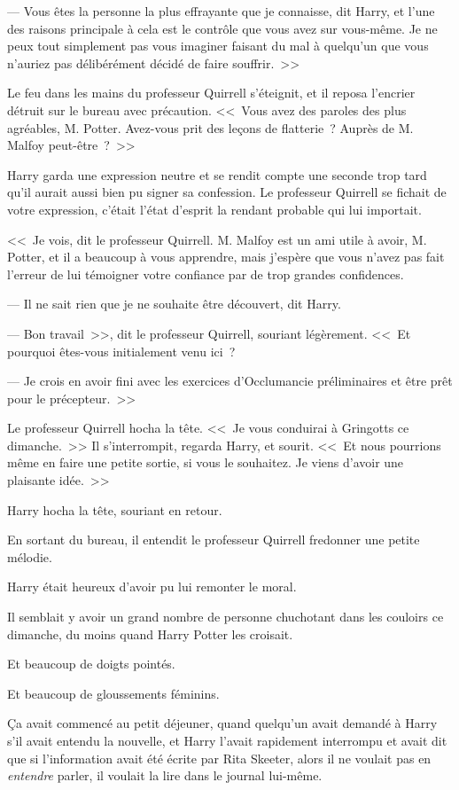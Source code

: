 --- Vous êtes la personne la plus effrayante que je connaisse, dit Harry, et l'une des raisons principale à cela est le contrôle que vous avez sur vous-même. Je ne peux tout simplement pas vous imaginer faisant du mal à quelqu'un que vous n'auriez pas délibérément décidé de faire souffrir.~>>

Le feu dans les mains du professeur Quirrell s'éteignit, et il reposa l'encrier détruit sur le bureau avec précaution. <<~Vous avez des paroles des plus agréables, M. Potter. Avez-vous prit des leçons de flatterie~? Auprès de M. Malfoy peut-être~?~>>

Harry garda une expression neutre et se rendit compte une seconde trop tard qu'il aurait aussi bien pu signer sa confession. Le professeur Quirrell se fichait de votre expression, c'était l'état d'esprit la rendant probable qui lui importait.

<<~Je vois, dit le professeur Quirrell. M. Malfoy est un ami utile à avoir, M. Potter, et il a beaucoup à vous apprendre, mais j'espère que vous n'avez pas fait l'erreur de lui témoigner votre confiance par de trop grandes confidences.

--- Il ne sait rien que je ne souhaite être découvert, dit Harry.

--- Bon travail~>>, dit le professeur Quirrell, souriant légèrement. <<~Et pourquoi êtes-vous initialement venu ici~?

--- Je crois en avoir fini avec les exercices d'Occlumancie préliminaires et être prêt pour le précepteur.~>>

Le professeur Quirrell hocha la tête. <<~Je vous conduirai à Gringotts ce dimanche.~>> Il s'interrompit, regarda Harry, et sourit. <<~Et nous pourrions même en faire une petite sortie, si vous le souhaitez. Je viens d'avoir une plaisante idée.~>>

Harry hocha la tête, souriant en retour.

En sortant du bureau, il entendit le professeur Quirrell fredonner une petite mélodie.

Harry était heureux d'avoir pu lui remonter le moral.

\later

Il semblait y avoir un grand nombre de personne chuchotant dans les couloirs ce dimanche, du moins quand Harry Potter les croisait.

Et beaucoup de doigts pointés.

Et beaucoup de gloussements féminins.

Ça avait commencé au petit déjeuner, quand quelqu'un avait demandé à Harry s'il avait entendu la nouvelle, et Harry l'avait rapidement interrompu et avait dit que si l'information avait été écrite par Rita Skeeter, alors il ne voulait pas en \emph{entendre} parler, il voulait la lire dans le journal lui-même.


